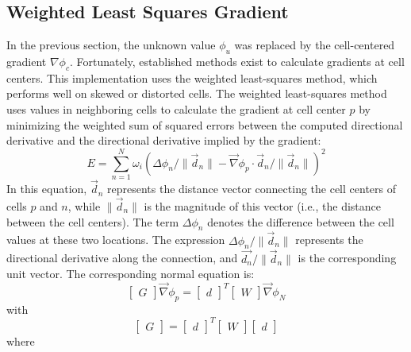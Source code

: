 \subsection{Weighted Least Squares Gradient}
In the previous section, the unknown value $\phi_u$ was replaced by the cell-centered gradient $\nabla \phi_c$. 
Fortunately, established methods exist to calculate gradients at cell centers.
This implementation uses the weighted least-squares method, which performs well on skewed or distorted cells.
The weighted least-squares method uses values in neighboring cells to calculate the gradient at cell center $p$ by minimizing the weighted sum of squared errors between the computed directional derivative and the directional derivative implied by the gradient:
\begin{equation}
	E = \sum_{n=1}^{N} \omega_i \left(\Delta \phi_n / \|\vec{d}_n \| - \vec{\nabla}\phi_p \cdot \vec{d}_n / \|\vec{d}_n \|\right)^2
\end{equation}
In this equation, $\vec{d}_n$ represents the distance vector connecting the cell centers of cells $p$ and $n$, while $\|\vec{d}_n \|$ is the magnitude of this vector (i.e., the distance between the cell centers). 
The term $\Delta\phi_n$ denotes the difference between the cell values at these two locations.
The expression $\Delta \phi_n / \|\vec{d}_n\|$ represents the directional derivative along the connection, and $\vec{d_n} /\|\vec{d}_n\|$ is the corresponding unit vector. The corresponding normal equation is:
\begin{equation}
	\begin{bmatrix}G\end{bmatrix} \vec{\nabla}\phi_p = \begin{bmatrix}d\end{bmatrix}^T \begin{bmatrix}W\end{bmatrix} \vec{\nabla}\phi_N
	\label{eqn:normal-eqn}
\end{equation}
with
\begin{equation}
	\begin{bmatrix}G\end{bmatrix} = \begin{bmatrix}d\end{bmatrix}^T \begin{bmatrix}W\end{bmatrix} \begin{bmatrix}d\end{bmatrix}
\end{equation}
where
